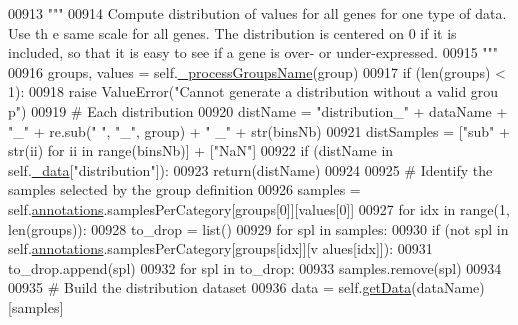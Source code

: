 \begin{DoxyCode}
00913         \textcolor{stringliteral}{"""}
00914 \textcolor{stringliteral}{        Compute distribution of values for all genes for one type of data. Use th
      e same scale for all genes. The distribution is centered on 0 if it is included, 
      so that it is easy to see if a gene is over- or under-expressed.}
00915 \textcolor{stringliteral}{        """}
00916         groups, values = self.\hyperlink{classnavicom_1_1navicom_1_1NaviCom_a1b8f14be167905533ab7e18294dd9100}{_processGroupsName}(group)
00917         \textcolor{keywordflow}{if} (len(groups) < 1):
00918             \textcolor{keywordflow}{raise} ValueError(\textcolor{stringliteral}{"Cannot generate a distribution without a valid grou
      p"})
00919         \textcolor{comment}{# Each distribution }
00920         distName = \textcolor{stringliteral}{"distribution\_"} + dataName + \textcolor{stringliteral}{"\_"} + re.sub(\textcolor{stringliteral}{" "}, \textcolor{stringliteral}{"\_"}, group) + \textcolor{stringliteral}{"
      \_"} + str(binsNb)
00921         distSamples = [\textcolor{stringliteral}{"sub"} + str(ii) \textcolor{keywordflow}{for} ii \textcolor{keywordflow}{in} range(binsNb)] + [\textcolor{stringliteral}{"NaN"}]
00922         \textcolor{keywordflow}{if} (distName \textcolor{keywordflow}{in} self.\hyperlink{classnavicom_1_1navicom_1_1NaviCom_a407b2b5c30a5652ee85c4be54b3e6679}{_data}[\textcolor{stringliteral}{"distribution"}]):
00923             \textcolor{keywordflow}{return}(distName)
00924 
00925         \textcolor{comment}{# Identify the samples selected by the group definition}
00926         samples = self.\hyperlink{classnavicom_1_1navicom_1_1NaviCom_a0386d881214943cf3432d0ffe22cbb71}{annotations}.samplesPerCategory[groups[0]][values[0]]
00927         \textcolor{keywordflow}{for} idx \textcolor{keywordflow}{in} range(1, len(groups)):
00928             to\_drop = list()
00929             \textcolor{keywordflow}{for} spl \textcolor{keywordflow}{in} samples:
00930                 \textcolor{keywordflow}{if} (\textcolor{keywordflow}{not} spl \textcolor{keywordflow}{in} self.\hyperlink{classnavicom_1_1navicom_1_1NaviCom_a0386d881214943cf3432d0ffe22cbb71}{annotations}.samplesPerCategory[groups[idx]][v
      alues[idx]]):
00931                     to\_drop.append(spl)
00932             \textcolor{keywordflow}{for} spl \textcolor{keywordflow}{in} to\_drop:
00933                 samples.remove(spl)
00934 
00935         \textcolor{comment}{# Build the distribution dataset}
00936         data = self.\hyperlink{classnavicom_1_1navicom_1_1NaviCom_ad675e899836271ff4f2fd4bd17ea81d9}{getData}(dataName)[samples]

\end{DoxyCode}
